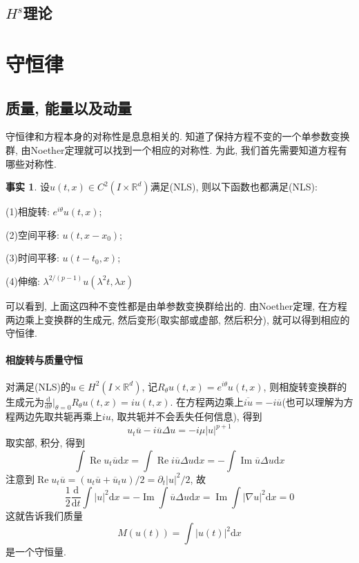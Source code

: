 \documentclass{ctexbook}
\theoremstyle{definition}
\newtheorem{fact}[definition]{事实}
\theoremstyle{remark}
\newcommand{\dif}{\mathrm{d}}
\begin{document}
\subsection{$H^s$理论}
\section{守恒律}
\subsection{质量, 能量以及动量}
守恒律和方程本身的对称性是息息相关的. 知道了保持方程不变的一个单参数变换群, 由Noether定理就可以找到一个相应的对称性. 为此, 我们首先需要知道方程有哪些对称性. 

\begin{fact}
设$u(t,x)\in C^2(I\times\mathbb{R}^d)$满足(NLS), 则以下函数也都满足(NLS):
 
(1)相旋转: $e^{i\theta}u(t,x)$; 

(2)空间平移: $u(t,x-x_0)$;

(3)时间平移: $u(t-t_0,x)$; 

(4)伸缩: $\lambda^{2/(p-1)}u(\lambda^2t,\lambda x)$
\end{fact}

可以看到, 上面这四种不变性都是由单参数变换群给出的. 由Noether定理, 在方程两边乘上变换群的生成元, 然后变形(取实部或虚部, 然后积分), 就可以得到相应的守恒律. 

\paragraph{相旋转与质量守恒}对满足(NLS)的$u\in H^2(I\times\mathbb{R}^d)$, 记$R_\theta u(t,x)=e^{i\theta}u(t,x)$, 则相旋转变换群的生成元为$\frac{\dif}{\dif\theta}\left.\right|_{\theta=0}R_\theta u(t,x)=iu(t,x)$. 在方程两边乘上$\overline{iu}=-i\overline{u}$(也可以理解为方程两边先取共轭再乘上$iu$, 取共轭并不会丢失任何信息), 得到
$$u_t\overline{u}-i\overline{u}\Delta u=-i\mu|u|^{p+1}$$
取实部, 积分, 得到
$$\int \operatorname{Re}u_t\overline{u}\dif x=\int \operatorname{Re}i\overline{u}\Delta u\dif x=-\int\operatorname{Im}\overline{u}\Delta u\dif x$$
注意到$\operatorname{Re}u_t\overline{u}=(u_t\overline{u}+\overline{u}_tu)/2=\partial_t|u|^2/2$, 故
$$\frac{1}{2}\frac{\dif}{\dif t}\int|u|^2\dif x=-\operatorname{Im}\int\overline{u}\Delta u\dif x=\operatorname{Im}\int|\nabla u|^2\dif x= 0$$
这就告诉我们质量
$$M(u(t))=\int|u(t)|^2\dif x$$
是一个守恒量. 
\end{document}
